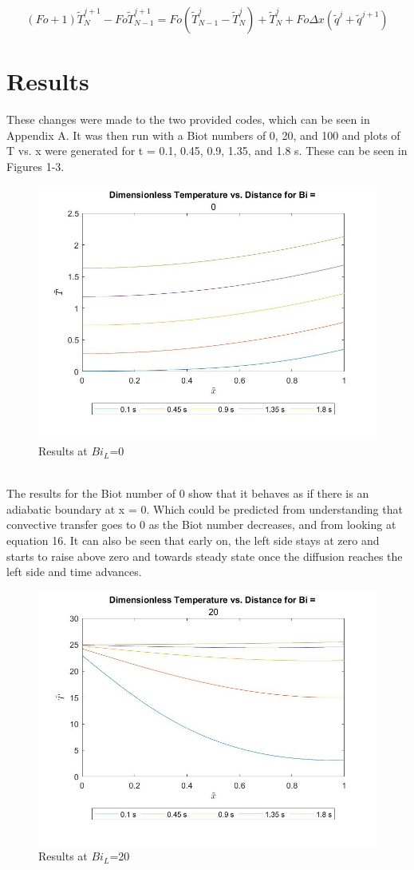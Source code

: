 \documentclass[conf]{new-aiaa}
\begin{document}
\begin{equation}
\label{sample:equation}
   (Fo+1)\tilde{T}^{j+1}_N-Fo\tilde{T}^{j+1}_{N-1}=Fo (\tilde{T}^j_{N-1}-\tilde{T}^j_N)+\tilde{T}^{j}_N+Fo \Delta x (\tilde{q}^j+\tilde{q}^{j+1})
\end{equation}

\section{Results}
These changes were made to the two provided codes, which can be seen in Appendix A. It was then run with a Biot numbers of 0, 20, and 100 and plots of T vs. x were generated for t = 0.1, 0.45, 0.9, 1.35, and 1.8 s. These can be seen in Figures 1-3.
\\
\begin{figure}[hbt!]
\centering
\includegraphics[width=.5\textwidth]{Bi0.jpg}
\caption{Results at $Bi_L$=0}
\end{figure}
\\
The results for the Biot number of 0 show that it behaves as if there is an adiabatic boundary at x = 0. Which could be predicted from understanding that convective transfer goes to 0 as the Biot number decreases, and from looking at equation 16. It can also be seen that early on, the left side stays at zero and starts to raise above zero and towards steady state once the diffusion reaches the left side and time advances.
\\
\begin{figure}[hbt!]
\centering
\includegraphics[width=.5\textwidth]{Bi20.jpg}
\caption{Results at $Bi_L$=20}
\end{figure}
\end{document}

